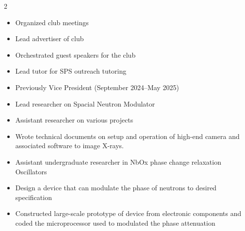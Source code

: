 \documentclass[10pt,a4paper,withhyper]{altacv}
\begin{document}
\begin{paracol}{2}
\begin{itemize}
    \item Organized club meetings
    \item Lead advertiser of club
    \item Orchestrated guest speakers for the club 
    \item Lead tutor for SPS outreach tutoring
    \item Previously Vice President (September 2024--May 2025)
\end{itemize}

\divider

\begin{itemize}
\item Lead researcher on Spacial Neutron Modulator
\item Assistant researcher on various projects
\end{itemize}

\divider

\begin{itemize}
    \item Wrote technical documents on setup and operation of high-end camera and associated software to image X-rays.
\end{itemize}

\divider

\begin{itemize}
\item Assistant undergraduate researcher in  NbOx phase change relaxation Oscillators
\end{itemize}


\begin{itemize}
\item Design a device that can modulate the phase of neutrons to desired specification
\item Constructed large-scale prototype of device from electronic components and coded the microprocessor used to modulated the phase attenuation
\end{itemize}


\end{paracol}
\end{document}
